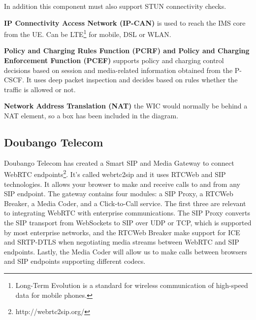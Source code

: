 In addition this component must also support STUN connectivity checks.

\textbf{IP Connectivity Access Network (IP-CAN)}
is used to reach the IMS core from the UE. Can be LTE\footnote{Long-Term Evolution is a standard for wireless communication of high-speed data for mobile phones.} for mobile, DSL or WLAN.

\textbf{Policy and Charging Rules Function (PCRF) and Policy and Charging Enforcement Function (PCEF)}
supports policy and charging control decisions based on session and media-related information obtained from the P-CSCF. It uses deep packet inspection and decides based on rules whether the traffic is allowed or not.

\textbf{Network Address Translation (NAT)}
the WIC would normally be behind a NAT element, so a box has been included in the diagram.

\subsection{Doubango Telecom}
Doubango Telecom has created a Smart SIP and Media Gateway to connect WebRTC endpoints\footnote{http://webrtc2sip.org/}. It's called webrtc2sip and it uses RTCWeb and SIP technologies. It allows your browser to make and receive calls to and from any SIP endpoint. The gateway contains four modules: a SIP Proxy, a RTCWeb Breaker, a Media Coder, and a Click-to-Call service. The first three are relevant to integrating WebRTC with enterprise communications. The SIP Proxy converts the SIP transport from WebSockets to SIP over UDP or TCP, which is supported by most enterprise networks, and the RTCWeb Breaker make support for ICE and SRTP-DTLS when negotiating media streams between WebRTC and SIP endpoints. Lastly, the Media Coder will allow us to make calls between browsers and SIP endpoints supporting different codecs.